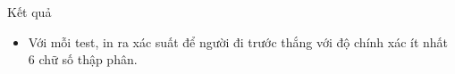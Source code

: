 Kết quả
\begin{itemize}
	\item     Với mỗi test, in ra xác suất để người đi trước thắng với độ chính xác ít nhất 6 chữ số thập phân.   
\end{itemize}